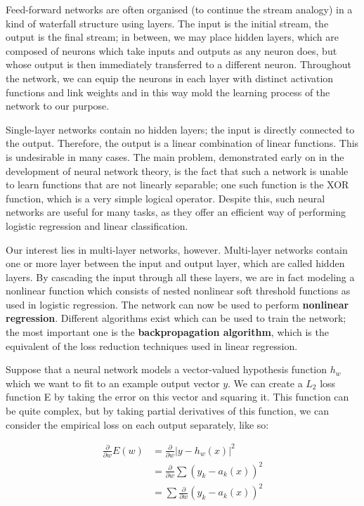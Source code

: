 Feed-forward networks are often organised (to continue the stream
analogy) in a kind of waterfall structure using layers. The input is
the initial stream, the output is the final stream; in between, we may
place hidden layers, which are composed of neurons which take inputs
and outputs as any neuron does, but whose output is then immediately
transferred to a different neuron. Throughout the network, we can
equip the neurons in each layer with distinct activation functions and
link weights and in this way mold the learning process of the network
to our purpose.

Single-layer networks contain no hidden layers; the input is directly
connected to the output. Therefore, the output is a linear combination
of linear functions. This is undesirable in many cases. The main
problem, demonstrated early on in the development of neural network
theory, is the fact that such a network is unable to learn functions
that are not linearly separable; one such function is the XOR
function, which is a very simple logical operator. Despite this, such
neural networks are useful for many tasks, as they offer an efficient
way of performing logistic regression and linear classification.

Our interest lies in multi-layer networks, however. Multi-layer
networks contain one or more layer between the input and output layer,
which are called hidden layers. By cascading the input through all
these layers, we are in fact modeling a nonlinear function which
consists of nested nonlinear soft threshold functions as used in
logistic regression. The network can now be used to perform \textbf{nonlinear
  regression}. Different algorithms exist which can be used to train the
network; the most important one is the \textbf{backpropagation algorithm},
which is the equivalent of the loss reduction techniques used in
linear regression.

Suppose that a neural network models a vector-valued hypothesis
function $h_w$ which we want to fit to an example output vector
$y$. We can create a $L_2$ loss function E by taking the error on this
vector and squaring it. This function can be quite complex, but by
taking partial derivatives of this function, we can consider the
empirical loss on each output separately, like so:

\begin{equation}
  \begin{aligned} 
    \frac{\partial}{\partial w} E(w) &= \frac{\partial}{\partial w} \lvert y - h_w(x) \rvert^2 \\
    &= \frac{\partial}{\partial w} \sum (y_k - a_k(x))^2 \\
    &=  \sum \frac{\partial}{\partial w} (y_k - a_k(x))^2
  \end{aligned} 
\end{equation}

